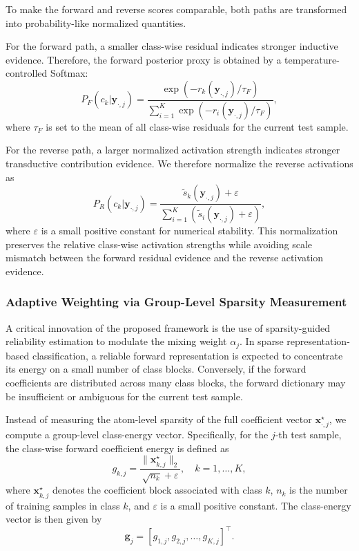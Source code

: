 \documentclass[10pt,comsoc]{IEEEtran}
\begin{document}
To make the forward and reverse scores comparable, both paths are transformed into probability-like normalized quantities.

For the forward path, a smaller class-wise residual indicates stronger inductive evidence. Therefore, the forward posterior proxy is obtained by a temperature-controlled Softmax:
\begin{equation}
	\label{eq:forward_posterior}
	P_F(c_k | \mathbf{y}_{\cdot,j}) =
	\frac{
		\exp(-r_k(\mathbf{y}_{\cdot,j}) / \tau_F)
	}{
		\sum_{i=1}^K \exp(-r_i(\mathbf{y}_{\cdot,j}) / \tau_F)
	},
\end{equation}
where $\tau_F$ is set to the mean of all class-wise residuals for the current test sample.

For the reverse path, a larger normalized activation strength indicates stronger transductive contribution evidence. We therefore normalize the reverse activations as
\begin{equation}
	\label{eq:reverse_posterior}
	P_R(c_k | \mathbf{y}_{\cdot,j}) =
	\frac{
		\tilde{s}_k(\mathbf{y}_{\cdot,j}) + \varepsilon
	}{
		\sum_{i=1}^K \left(\tilde{s}_i(\mathbf{y}_{\cdot,j}) + \varepsilon\right)
	},
\end{equation}
where $\varepsilon$ is a small positive constant for numerical stability. This normalization preserves the relative class-wise activation strengths while avoiding scale mismatch between the forward residual evidence and the reverse activation evidence.

\subsubsection{Adaptive Weighting via Group-Level Sparsity Measurement}

A critical innovation of the proposed framework is the use of sparsity-guided reliability estimation to modulate the mixing weight $\alpha_j$. In sparse representation-based classification, a reliable forward representation is expected to concentrate its energy on a small number of class blocks. Conversely, if the forward coefficients are distributed across many class blocks, the forward dictionary may be insufficient or ambiguous for the current test sample.

Instead of measuring the atom-level sparsity of the full coefficient vector $\mathbf{x}_{\cdot,j}^{\star}$, we compute a group-level class-energy vector. Specifically, for the $j$-th test sample, the class-wise forward coefficient energy is defined as
\begin{equation}
	\label{eq:class_energy}
	g_{k,j}
	=
	\frac{
		\|\mathbf{x}_{k,j}^{\star}\|_2
	}{
		\sqrt{n_k}+\varepsilon
	},
	\quad k=1,\ldots,K,
\end{equation}
where $\mathbf{x}_{k,j}^{\star}$ denotes the coefficient block associated with class $k$, $n_k$ is the number of training samples in class $k$, and $\varepsilon$ is a small positive constant. The class-energy vector is then given by
\begin{equation}
	\label{eq:class_energy_vector}
	\mathbf{g}_j =
	[g_{1,j}, g_{2,j}, \ldots, g_{K,j}]^{\top}.
\end{equation}
\end{document}
